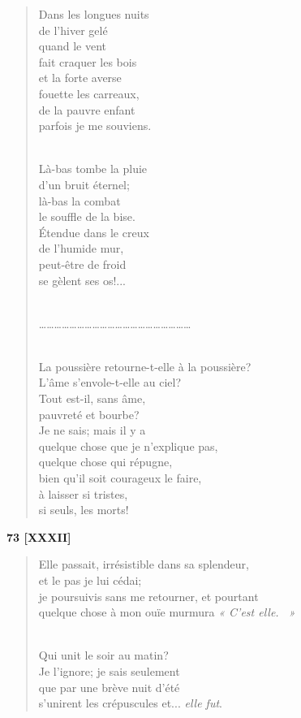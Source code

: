 \documentclass[a4paper,12pt]{book}
\begin{document}
\begin{verse}
Dans les longues nuits \\
de l'hiver gelé \\
quand le vent \\
fait craquer les bois \\
et la forte averse \\
fouette les carreaux, \\
de la pauvre enfant \\
parfois je me souviens. \\ \

Là-bas tombe la pluie \\
d'un bruit éternel; \\
là-bas la combat \\
le souffle de la bise. \\
Étendue dans le creux \\
de l'humide mur, \\
peut-être de froid \\
se gèlent ses os!... \\ \

\ldots\ldots\ldots\ldots\ldots\ldots\ldots\ldots\ldots\ldots\ldots\ldots\ldots\ldots\ldots\ldots\ldots\ldots\ldots\ldots \\ \

La poussière retourne-t-elle à la poussière? \\
L'âme s'envole-t-elle au ciel? \\
Tout est-il, sans âme, \\
pauvreté et bourbe? \\
Je ne sais; mais il y a \\
quelque chose que je n'explique pas, \\
quelque chose qui répugne, \\
bien qu'il soit courageux le faire, \\
à laisser si tristes, \\
si seuls, les morts! \\
\end{verse}

\bigskip

\begin{center} {\bf 73 [XXXII]} \end{center}

\begin{verse}
Elle passait, irrésistible dans sa splendeur, \\
et le pas je lui cédai; \\
je poursuivis sans me retourner, et pourtant \\
quelque chose à mon ouïe murmura {\em « C'est elle. ~»} \\ \

Qui unit le soir au matin? \\
Je l'ignore; je sais seulement \\
que par une brève nuit d'été \\
s'unirent les crépuscules et... {\em elle fut}. \\
\end{verse}
\end{document}

